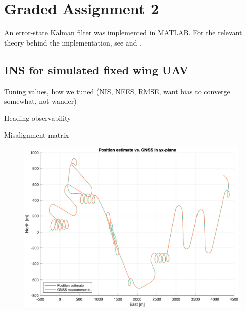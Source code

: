 \section{Graded Assignment 2}\label{sec:graded_assignment_2}


An error-state Kalman filter was implemented in MATLAB. For the relevant theory behind the implementation, see \cite{Sola} and \cite{Edmund}.

\subsection{INS for simulated fixed wing UAV}

Tuning values, how we tuned (NIS, NEES, RMSE, want bias to converge somewhat, not wander)

Heading observability

Misalignment matrix

\begin{figure}[!htb]
    \centering
    \includegraphics[width=0.6\linewidth]{figures/ga_2/sim_trajectory.eps}
    \caption{}
    \label{fig:ga_2_sim_trajectory}
\end{figure}


